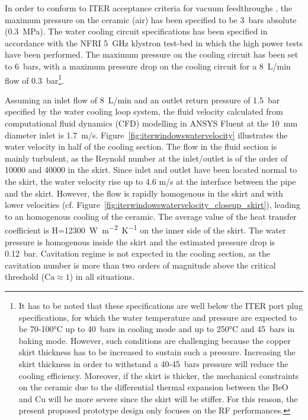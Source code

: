 {In order to conform to ITER acceptance criteria for vacuum feedthroughs , the maximum pressure on the ceramic (air) has been specified to be 3~bars absolute (0.3~MPa). The water cooling circuit specifications has been specified in accordance with the NFRI 5~GHz klystron test-bed in which the high power tests have been performed. The maximum pressure on the cooling circuit has been set to 6~bars, with a maximum pressure drop on the cooling circuit for a 8~L/min flow of 0.3~bar\footnote{It has to be noted that these specifications are well below the ITER port plug specifications, for which the water temperature and pressure are expected to be 70-100$\si{\celsius}$ up to 40~bars in cooling mode and up to 250$\si{\celsius}$ and 45~bars in baking mode. However, such conditions are challenging because the copper skirt thickness has to be increased to sustain such a pressure. Increasing the skirt thickness in order to withstand a 40-45~bars pressure will reduce the cooling efficiency. Moreover, if the skirt is thicker, the mechanical constraints on the ceramic due to the differential thermal expansion between the BeO and Cu will be more severe since the skirt will be stiffer. For this reason, the present proposed prototype design only focuses on the RF performances.}. 

Assuming an inlet flow of 8~L/min and an outlet return pressure of 1.5~bar specified by the water cooling loop system, the fluid velocity calculated from computational fluid dynamics (CFD) modelling in ANSYS Fluent at the 10~mm diameter inlet is 1.7~m/s. Figure~\ref{fig:iterwindowswatervelocity} illustrates the water velocity in half of the cooling section. The flow in the fluid section is mainly turbulent, as the Reynold number at the inlet/outlet is of the order of 10000 and 40000 in the skirt. Since inlet and outlet have been located normal to the skirt, the water velocity rise up to 4.6 m/s at the interface between the pipe and the skirt. However, the flow is rapidly homogenous in the skirt and with lower velocities (cf. Figure~\ref{fig:iterwindowswatervelocity_closeup_skirt}), leading to an homogenous cooling of the ceramic. The average value of the heat transfer coefficient is H=12300~\si{W.m^{-2}K^{-1}} on the inner side of the skirt. The water pressure is homogenous inside the skirt and the estimated pressure drop is 0.12~bar. Cavitation regime is not expected in the cooling section, as the cavitation number is more than two orders of magnitude above the critical threshold ($\mathrm{Ca}\approx 1$) in all situations.

}
